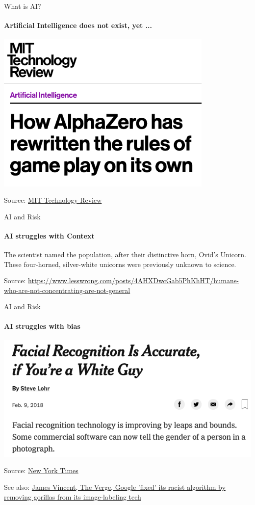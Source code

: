 \begin{frame}{What is AI?}
  \framesubtitle{Artificial Intelligence does not exist, yet ...}
  \includegraphics[width=0.8\textwidth]{graphics/alpha_go}

  Source: \href{https://www.technologyreview.com/s/612923/how-alphazero-has-rewritten-the-rules-of-gameplay-on-its-own/}{MIT Technology Review}
\end{frame}

\begin{frame}{AI and Risk}
  \framesubtitle{AI struggles with Context}
  The scientist named the population, after their distinctive horn, Ovid's Unicorn. These four-horned, silver-white unicorns were previously unknown to science.\newline

  Source: \href{https://www.lesswrong.com/posts/4AHXDwcGab5PhKhHT/humans-who-are-not-concentrating-are-not-general}{https://www.lesswrong.com/posts/4AHXDwcGab5PhKhHT/humans-who-are-not-concentrating-are-not-general}
\end{frame}

\begin{frame}{AI and Risk}
  \framesubtitle{AI struggles with bias}
  \includegraphics[height=0.6\textheight]{graphics/facial_bias}

  Source: \href{https://www.nytimes.com/2018/02/09/technology/facial-recognition-race-artificial-intelligence.html}{New York Times}

  See also: \href{https://www.theverge.com/2018/1/12/16882408/google-racist-gorillas-photo-recognition-algorithm-ai}{James Vincent, The Verge, Google 'fixed' its racist algorithm by removing gorillas from its image-labeling tech}
\end{frame}

